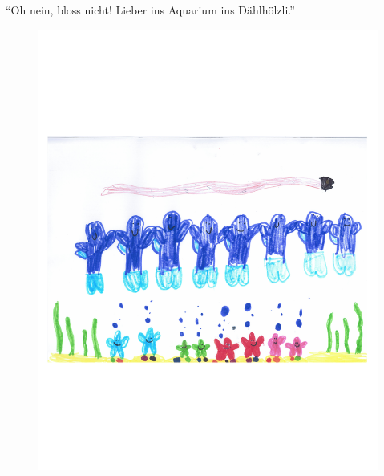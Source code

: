 \enquote{Oh nein, bloss nicht! Lieber ins Aquarium ins Dählhölzli.} \hfill {\color{red}\decofourleft}

\vspace{25pt}
\begin{figure}[h]
\centering
\includegraphics[width=\textwidth]{bilder/kerzers2.pdf}
\end{figure}

